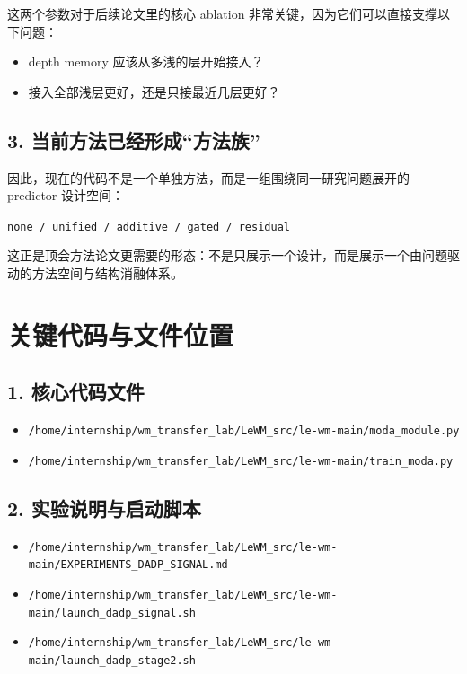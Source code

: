 \documentclass[UTF8,a4paper,11pt]{ctexart}
\begin{document}
这两个参数对于后续论文里的核心 ablation 非常关键，因为它们可以直接支撑以下问题：

\begin{itemize}[leftmargin=2em]
  \item depth memory 应该从多浅的层开始接入？
  \item 接入全部浅层更好，还是只接最近几层更好？
\end{itemize}

\subsection{3. 当前方法已经形成“方法族”}

因此，现在的代码不是一个单独方法，而是一组围绕同一研究问题展开的 predictor 设计空间：

\begin{center}
\texttt{none / unified / additive / gated / residual}
\end{center}

这正是顶会方法论文更需要的形态：不是只展示一个设计，而是展示一个由问题驱动的方法空间与结构消融体系。

\section{关键代码与文件位置}

\subsection{1. 核心代码文件}

\begin{itemize}[leftmargin=2em]
  \item \texttt{/home/internship/wm\_transfer\_lab/LeWM\_src/le-wm-main/moda\_module.py}
  \item \texttt{/home/internship/wm\_transfer\_lab/LeWM\_src/le-wm-main/train\_moda.py}
\end{itemize}

\subsection{2. 实验说明与启动脚本}

\begin{itemize}[leftmargin=2em]
  \item \texttt{/home/internship/wm\_transfer\_lab/LeWM\_src/le-wm-main/EXPERIMENTS\_DADP\_SIGNAL.md}
  \item \texttt{/home/internship/wm\_transfer\_lab/LeWM\_src/le-wm-main/launch\_dadp\_signal.sh}
  \item \texttt{/home/internship/wm\_transfer\_lab/LeWM\_src/le-wm-main/launch\_dadp\_stage2.sh}
\end{itemize}
\end{document}
